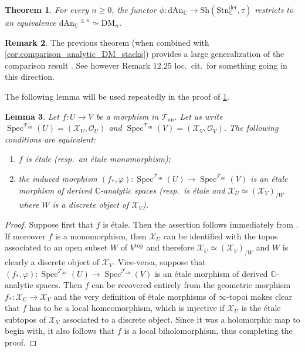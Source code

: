 \documentclass[12pt,a4paper,reqno]{amsart}
\theoremstyle{plain}
\newtheorem{thm}{Theorem}[section]
\newtheorem{lem}[thm]{Lemma}
\theoremstyle{definition}
\newtheorem{rem}[thm]{Remark}
\theoremstyle{remark}
\numberwithin{equation}{section}
\begin{document}
\begin{thm} \label{thm:analytic_functor_of_points}
	For every $n \ge 0$, the functor $\phi \colon {\mathrm{dAn}_{\mathbb C}} \to {\mathrm{Sh}}({\mathrm{Stn}^{\mathrm{der}}_{\mathbb C}}, \tau)$ restricts to an equivalence ${\mathrm{dAn}_{\mathbb C}}^{\le n} \simeq \mathrm{DM}_n$.
\end{thm}

\begin{rem}
	The previous theorem (when combined with \cref{cor:comparison_analytic_DM_stacks}) provides a large generalization of the comparison result \cite[Theorem 12.8]{DAG-IX}.
	See however Remark 12.25 loc.\ cit.\ for something going in this direction.
\end{rem}

The following lemma will be used repeatedly in the proof of \cref{thm:analytic_functor_of_points}.

\begin{lem} \label{lem:little_phi_reflects_etale}
	Let $f \colon U \to V$ be a morphism in ${{\mathcal T}_{\mathrm{an}}}$.
	Let us write $\operatorname{Spec}^{{\mathcal T}_{\mathrm{an}}}(U) = ({\mathcal X}_U, {\mathcal O}_U)$ and $\operatorname{Spec}^{{\mathcal T}_{\mathrm{an}}}(V) = ({\mathcal X}_V, {\mathcal O}_V)$.
	The following conditions are equivalent:
	\begin{enumerate}
		\item $f$ is \'etale (resp.\ an \'etale monomorphism);
		\item the induced morphism $(f_*, \varphi) \colon \operatorname{Spec}^{{\mathcal T}_{\mathrm{an}}}(U) \to \operatorname{Spec}^{{\mathcal T}_{\mathrm{an}}}(V)$ is an \'etale morphism of derived {$\mathbb C$-analytic\xspace} spaces (resp.\ is \'etale and ${\mathcal X}_U \simeq ({\mathcal X}_V)_{/W}$ where $W$ is a discrete object of ${\mathcal X}_V$).
	\end{enumerate}
\end{lem}

\begin{proof}
	Suppose first that $f$ is \'etale. Then the assertion follows immediately from \cite[Example 2.3.8]{DAG-V}.
	If moreover $f$ is a monomorphism, then ${\mathcal X}_U$ can be identified with the topos associated to an open subset $W$ of $V{^\mathrm{top}}$ and therefore ${\mathcal X}_U \simeq ({\mathcal X}_V)_{/W}$ and $W$ is clearly a discrete object of ${\mathcal X}_V$.
	Vice-versa, suppose that $(f_*, \varphi) \colon \operatorname{Spec}^{{\mathcal T}_{\mathrm{an}}}(U) \to \operatorname{Spec}^{{\mathcal T}_{\mathrm{an}}}(V)$ is an \'etale morphism of derived {$\mathbb C$-analytic\xspace} spaces.
	Then $f$ can be recovered entirely from the geometric morphism $f_* \colon {\mathcal X}_U \to {\mathcal X}_V$ and the very definition of \'etale morphisms of $\infty$-topoi makes clear that $f$ has to be a local homeomorphism, which is injective if ${\mathcal X}_U$ is the \'etale subtopos of ${\mathcal X}_V$ associated to a discrete object. Since it was a holomorphic map to begin with, it also follows that $f$ is a local biholomorphism, thus completing the proof.
\end{proof}
\end{document}
